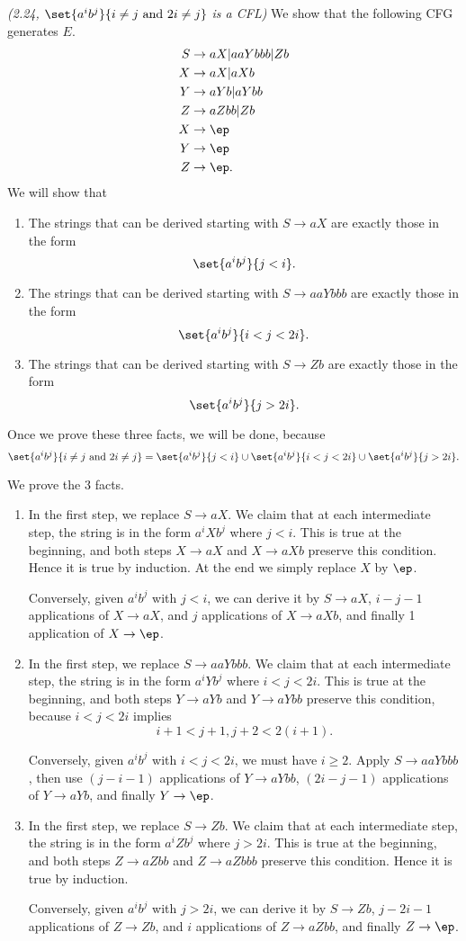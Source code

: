 \pagebreak

\begin{problem}{\it (2.24, $\set{a^ib^j}{i\ne j\text{ and }2i\ne j}$ is a CFL)}
We show that the following CFG generates $E$.
\begin{align*}
S&\to aX|aaYbbb|Zb\\
X&\to aX|aXb\\
Y&\to aYb|aYbb\\
Z&\to aZbb|Zb\\
X&\to \ep\\
Y&\to \ep\\
Z&\to \ep.
\end{align*}
We will show that
\begin{enumerate}
\item
The strings that can be derived starting with $S\to aX$ are exactly those in the form
\[
\set{a^ib^j}{j<i}.
\]
\item
The strings that can be derived starting with $S\to aaYbbb$ are exactly those in the form
\[
\set{a^ib^j}{i<j<2i}.
\]
\item
The strings that can be derived starting with $S\to Zb$ are exactly those in the form
\[
\set{a^ib^j}{j>2i}.
\]
\end{enumerate}
Once we prove these three facts, we will be done, because
\[
\set{a^ib^j}{i\ne j\text{ and }2i\ne j}=\set{a^ib^j}{j<i}\cup\set{a^ib^j}{i<j<2i}\cup \set{a^ib^j}{j>2i}.
\]

We prove the 3 facts.
\begin{enumerate}
\item In the first step, we replace $S\to aX$. We claim that at each intermediate step, the string is in the form $a^iXb^j$ where $j<i$. This is true at the beginning, and both steps $X\to aX$ and $X\to aXb$ preserve this condition. Hence it is true by induction. At the end we simply replace $X$ by $\ep$.

Conversely, given $a^ib^j$ with $j<i$, we can derive it by $S\to aX$, $i-j-1$ applications of $X\to aX$, and $j$ applications of $X\to aXb$, and finally 1 application of $X\to \ep$.
\item In the first step, we replace $S\to aaYbbb$. We claim that at each intermediate step, the string is in the form $a^iYb^j$ where $i<j<2i$. This is true at the beginning, and both steps $Y\to aYb$ and $Y\to aYbb$ preserve this condition, because $i<j<2i$ implies
\[
i+1<j+1,j+2<2(i+1).
\]

Conversely, given $a^ib^j$ with $i<j<2i$, we must have $i\ge 2$. 
Apply $S\to aaYbbb$, then use $(j-i-1)$ applications of $Y\to aYbb$, $(2i-j-1)$ applications of $Y\to aYb$, and finally $Y\to \ep$.
\item
In the first step, we replace $S\to Zb$. We claim that at each intermediate step, the string is in the form $a^iZb^j$ where $j>2i$. This is true at the beginning, and both steps $Z\to aZbb$ and $Z\to aZbbb$ preserve this condition. Hence it is true by induction.

Conversely, given $a^ib^j$ with $j>2i$, we can derive it by $S\to Zb$, $j-2i-1$ applications of $Z\to Zb$, and $i$ applications of $Z\to aZbb$, and finally $Z\to \ep$.
\end{enumerate}
\end{problem}

